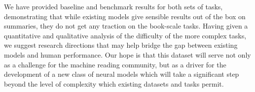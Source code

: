 \documentclass[11pt,letterpaper]{article}
\begin{document}
We have provided baseline and benchmark results for both sets of tasks, demonstrating that while existing models give sensible results out of the box on summaries, they do not get any traction on the book-scale tasks. Having given a quantitative and qualitative analysis of the difficulty of the more complex tasks, we suggest research directions that may help bridge the gap between existing models and human performance. Our hope is that this dataset will serve not only as a challenge for the machine reading community, but as a driver for the development of a new class of neural models which will take a significant step beyond the level of complexity which existing datasets and tasks permit.




\end{document}
